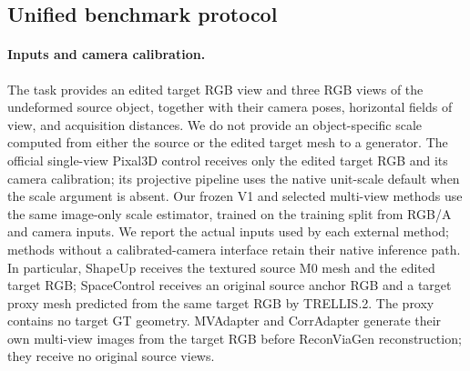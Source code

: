 \subsection{Unified benchmark protocol}
\paragraph{Inputs and camera calibration.}
The task provides an edited target RGB view and three RGB views of the
undeformed source object, together with their camera poses, horizontal fields
of view, and acquisition distances. We do not provide an object-specific
scale computed from either the source or the edited target mesh to a
generator. The official single-view Pixal3D control receives only the edited
target RGB and its camera calibration; its projective pipeline uses the native
unit-scale default when the scale argument is absent. Our frozen V1 and
selected multi-view methods use the same image-only scale estimator, trained
on the training split from RGB/A and camera inputs. We report the actual
inputs used by each external method; methods without a calibrated-camera
interface retain their native inference path. In particular, ShapeUp receives
the textured source M0 mesh and the edited target RGB; SpaceControl receives
an original source anchor RGB and a target proxy mesh predicted from the
same target RGB by TRELLIS.2. The proxy contains no target GT geometry.
MVAdapter and CorrAdapter generate their own multi-view images from the target
RGB before ReconViaGen reconstruction; they receive no original source views.

